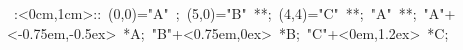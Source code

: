 \hbox{
\xy    <1cm,0cm>:<0cm,1cm>::
       (0,0)="A" ; (5,0)="B" **\dir{-}; 
       (4,4)="C" **\dir{-}; "A" **\dir{-};
       "A"+<-0.75em,-0.5ex> *{A};
       "B"+<0.75em,0ex> *{B};
       "C"+<0em,1.2ex> *{C};
       \endxy}
	   
